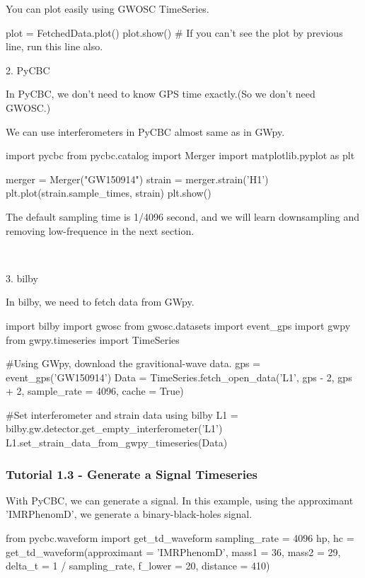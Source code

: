 You can plot easily using GWOSC TimeSeries.

\begin{python}[python3]
    plot = FetchedData.plot()
    plot.show() # If you can't see the plot by previous line, run this line also.
\end{python}

2. PyCBC

In PyCBC, we don't need to know GPS time exactly.(So we don't need GWOSC.)

We can use interferometers in PyCBC almost same as in GWpy.

\begin{python}[python3]
    import pycbc
    from pycbc.catalog import Merger
    import matplotlib.pyplot as plt

    merger = Merger("GW150914")
    strain = merger.strain('H1')
    plt.plot(strain.sample_times, strain)
    plt.show()
\end{python}

The default sampling time is 1/4096 second, and we will learn downsampling and removing low-frequence in the next section.

\ 

3. bilby

In bilby, we need to fetch data from GWpy.

\begin{python}[python3]
    import bilby
    import gwosc
    from gwosc.datasets import event_gps
    import gwpy
    from gwpy.timeseries import TimeSeries

    #Using GWpy, download the gravitional-wave data.
    gps = event_gps('GW150914')
    Data = TimeSeries.fetch_open_data('L1', gps - 2, gps + 2, sample_rate = 4096, cache = True)

    #Set interferometer and strain data using bilby
    L1 = bilby.gw.detector.get_empty_interferometer('L1')
    L1.set_strain_data_from_gwpy_timeseries(Data)
\end{python}

\subsubsection{Tutorial 1.3 - Generate a Signal Timeseries}

With PyCBC, we can generate a signal. In this example, using the approximant 'IMRPhenomD', we generate a binary-black-holes signal.

\begin{python}[python3]
    from pycbc.waveform import get_td_waveform
    sampling_rate = 4096
    hp, hc = get_td_waveform(approximant = 'IMRPhenomD',
                             mass1 = 36,
                             mass2 = 29,
                             delta_t = 1 / sampling_rate,
                             f_lower = 20,
                             distance = 410)
\end{python}

